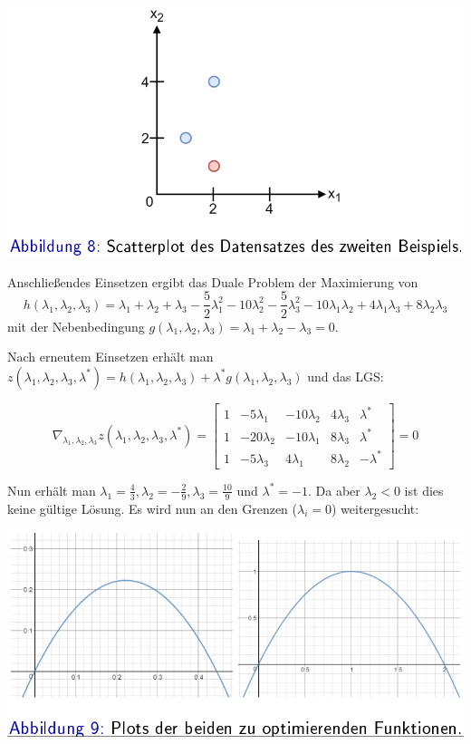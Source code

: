 \documentclass{report}
\begin{document}
  \begin{center}	
    \includegraphics[scale=.275]{ml06_8}	
  \end{center}	
  
  Anschließendes Einsetzen ergibt das Duale Problem der Maximierung von 	
  $$h(\lambda_1, \lambda_2, \lambda_3) = \lambda_1 + \lambda_2 + \lambda_3 - \frac{5}{2}\lambda_1^2 - 10\lambda_2^2 -	
  \frac{5}{2}\lambda_3^2 - 10\lambda_1\lambda_2 + 4\lambda_1\lambda_3 + 8\lambda_2\lambda_3$$	
  mit der Nebenbedingung $g(\lambda_1, \lambda_2, \lambda_3) = \lambda_1 + \lambda_2 - \lambda_3 = 0$.	
  
  Nach erneutem Einsetzen erhält man $z(\lambda_1, \lambda_2, \lambda_3, \lambda^*) = h(\lambda_1, \lambda_2, \lambda_3) +	
  \lambda^*g(\lambda_1, \lambda_2, \lambda_3)$ und das LGS:	
  
  $$\nabla_{\lambda_1, \lambda_2, \lambda_3}z(\lambda_1, \lambda_2, \lambda_3, \lambda^*) =	
  \begin{bmatrix}	
    1 & -5\lambda_1 & -10\lambda_2 & 4\lambda_3 & \lambda^*\\	
    1 & -20\lambda_2 & -10\lambda_1 & 8\lambda_3 & \lambda^*\\	
    1 & -5\lambda_3 & 4\lambda_1 & 8\lambda_2 & -\lambda^*	
  \end{bmatrix} = 0$$	
  
  Nun erhält man $\lambda_1 = \frac{4}{3}, \lambda_2 = -\frac{2}{9}, \lambda_3 = \frac{10}{9}$ und $\lambda^*=-1$.	
  Da aber $\lambda_2 < 0$ ist dies keine gültige Lösung. Es wird nun an den Grenzen ($\lambda_i = 0$) weitergesucht:	
  
  \begin{center}	
    \includegraphics[scale=.275]{ml06_9}	
  \end{center}	
  
\end{document}
